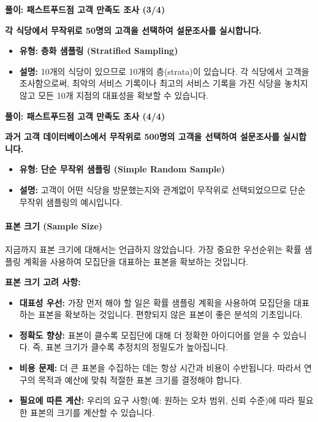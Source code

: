 \documentclass[11pt,a4paper]{book}
\newcommand{\concept}[1]{\textbf{#1}}
\theoremstyle{definition}
\begin{document}
\begin{solutionbox}
\textbf{풀이: 패스트푸드점 고객 만족도 조사 (3/4)}
\begin{enumerate}
    \setcounter{enumi}{2}
    \textbf{각 식당에서 무작위로 50명의 고객을 선택하여 설문조사를 실시합니다.}
    \begin{itemize}
        \item \textbf{유형:} \concept{층화 샘플링 (Stratified Sampling)}
        \item \textbf{설명:} 10개의 식당이 있으므로 10개의 층(strata)이 있습니다. 각 식당에서 고객을 조사함으로써, 최악의 서비스 기록이나 최고의 서비스 기록을 가진 식당을 놓치지 않고 모든 10개 지점의 대표성을 확보할 수 있습니다.
    \end{itemize}
\end{enumerate}
\end{solutionbox}

\begin{solutionbox}
\textbf{풀이: 패스트푸드점 고객 만족도 조사 (4/4)}
\begin{enumerate}
    \setcounter{enumi}{3}
    \textbf{과거 고객 데이터베이스에서 무작위로 500명의 고객을 선택하여 설문조사를 실시합니다.}
    \begin{itemize}
        \item \textbf{유형:} \concept{단순 무작위 샘플링 (Simple Random Sample)}
        \item \textbf{설명:} 고객이 어떤 식당을 방문했는지와 관계없이 무작위로 선택되었으므로 단순 무작위 샘플링의 예시입니다.
    \end{itemize}
\end{enumerate}
\end{solutionbox}

\paragraph{표본 크기 (Sample Size)}
지금까지 표본 크기에 대해서는 언급하지 않았습니다. 가장 중요한 우선순위는 확률 샘플링 계획을 사용하여 모집단을 대표하는 표본을 확보하는 것입니다.

\begin{tcolorbox}[summarybox]
\textbf{표본 크기 고려 사항:}
\begin{itemize}
    \item \textbf{대표성 우선:} 가장 먼저 해야 할 일은 확률 샘플링 계획을 사용하여 모집단을 대표하는 표본을 확보하는 것입니다. 편향되지 않은 표본이 좋은 분석의 기초입니다.
    \item \textbf{정확도 향상:} 표본이 클수록 모집단에 대해 더 정확한 아이디어를 얻을 수 있습니다. 즉, 표본 크기가 클수록 추정치의 정밀도가 높아집니다.
    \item \textbf{비용 문제:} 더 큰 표본을 수집하는 데는 항상 시간과 비용이 수반됩니다. 따라서 연구의 목적과 예산에 맞춰 적절한 표본 크기를 결정해야 합니다.
    \item \textbf{필요에 따른 계산:} 우리의 요구 사항(예: 원하는 오차 범위, 신뢰 수준)에 따라 필요한 표본의 크기를 계산할 수 있습니다.
\end{itemize}
\end{tcolorbox}
\end{document}
